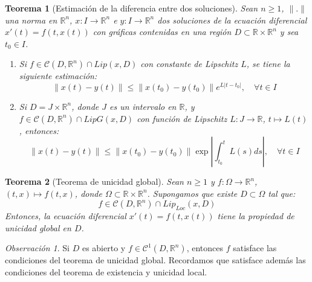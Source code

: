 \documentclass{report}
\newtheorem{theorem}{Teorema}[chapter]
\theoremstyle{remark}
\newtheorem*{remark}{Observación}
\theoremstyle{remark}
\theoremstyle{remark}
\theoremstyle{definition}
\theoremstyle{definition}
\theoremstyle{definition}
\begin{document}
\begin{theorem}[Estimación de la diferencia entre dos soluciones]
    Sean $n \geq 1$, $\|.\|$ una norma en $\mathbb{R}^n$, $x: I \to \mathbb{R}^n$ e $y: I \to \mathbb{R}^n$ dos soluciones de la ecuación diferencial $x'(t) = f(t, x(t))$ con gráficas contenidas en una región $D \subset \mathbb{R} \times \mathbb{R}^n$ y sea $t_0 \in I$.
    \begin{enumerate}
        \item Si $f \in \mathcal{C}(D, \mathbb{R}^n) \cap Lip(x, D)$ con constante de Lipschitz $L$, se tiene la siguiente estimación:
              $$\|x(t) - y(t)\| \leq \|x(t_0) - y(t_0)\| e^{L|t-t_0|}, \quad \forall t \in I$$
        \item Si $D = J \times \mathbb{R}^n$, donde $J$ es un intervalo en $\mathbb{R}$, y $f \in \mathcal{C}(D, \mathbb{R}^n) \cap LipG(x, D)$ con función de Lipschitz $L: J \to \mathbb{R}$, $t \mapsto L(t)$, entonces:
              $$\|x(t) - y(t)\| \leq \|x(t_0) - y(t_0)\| \exp\left| \int_{t_0}^t L(s)ds \right|, \quad \forall t \in I$$
    \end{enumerate}
\end{theorem}

\begin{theorem}[Teorema de unicidad global]
    Sean $n \geq 1$ y $f: \Omega \to \mathbb{R}^n$, $(t, x) \mapsto f(t, x)$, donde $\Omega \subset \mathbb{R} \times \mathbb{R}^n$.
    Supongamos que existe $D \subset \Omega$ tal que:
    $$f \in \mathcal{C}(D, \mathbb{R}^n) \cap Lip_{Loc}(x, D)$$
    Entonces, la ecuación diferencial $x'(t) = f(t, x(t))$ tiene la propiedad de unicidad global en $D$.
\end{theorem}

\begin{remark}
    Si $D$ es abierto y $f \in \mathcal{C}^1(D, \mathbb{R}^n)$, entonces $f$ satisface las condiciones del teorema de unicidad global.
    Recordamos que satisface además las condiciones del teorema de existencia y unicidad local.
\end{remark}
\end{document}
